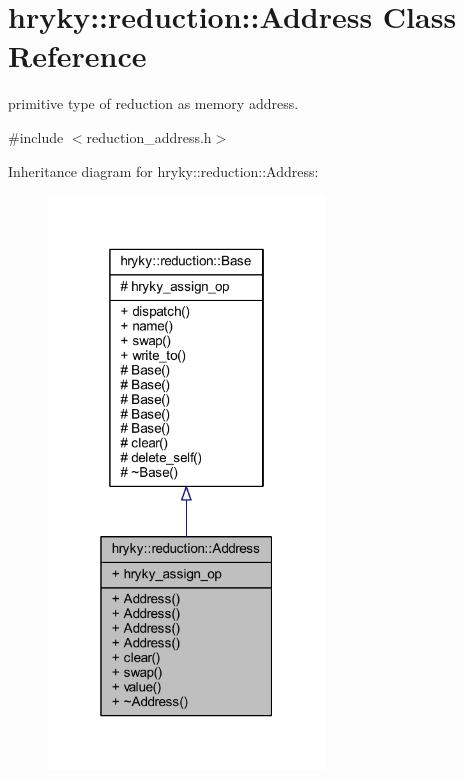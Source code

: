 \hypertarget{classhryky_1_1reduction_1_1_address}{\section{hryky\-:\-:reduction\-:\-:Address Class Reference}
\label{classhryky_1_1reduction_1_1_address}
}


primitive type of reduction as memory address.  




{\ttfamily \#include $<$reduction\-\_\-address.\-h$>$}



Inheritance diagram for hryky\-:\-:reduction\-:\-:Address\-:
\nopagebreak
\begin{figure}[H]
\begin{center}
\leavevmode
\includegraphics[width=208pt]{classhryky_1_1reduction_1_1_address__inherit__graph}
\end{center}
\end{figure}
